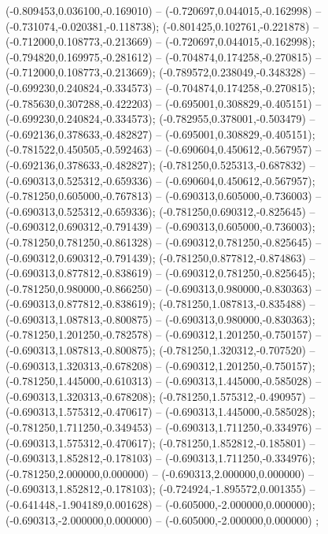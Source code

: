  (-0.809453,0.036100,-0.169010) -- (-0.720697,0.044015,-0.162998) -- (-0.731074,-0.020381,-0.118738);
 (-0.801425,0.102761,-0.221878) -- (-0.712000,0.108773,-0.213669) -- (-0.720697,0.044015,-0.162998);
 (-0.794820,0.169975,-0.281612) -- (-0.704874,0.174258,-0.270815) -- (-0.712000,0.108773,-0.213669);
 (-0.789572,0.238049,-0.348328) -- (-0.699230,0.240824,-0.334573) -- (-0.704874,0.174258,-0.270815);
 (-0.785630,0.307288,-0.422203) -- (-0.695001,0.308829,-0.405151) -- (-0.699230,0.240824,-0.334573);
 (-0.782955,0.378001,-0.503479) -- (-0.692136,0.378633,-0.482827) -- (-0.695001,0.308829,-0.405151);
 (-0.781522,0.450505,-0.592463) -- (-0.690604,0.450612,-0.567957) -- (-0.692136,0.378633,-0.482827);
 (-0.781250,0.525313,-0.687832) -- (-0.690313,0.525312,-0.659336) -- (-0.690604,0.450612,-0.567957);
 (-0.781250,0.605000,-0.767813) -- (-0.690313,0.605000,-0.736003) -- (-0.690313,0.525312,-0.659336);
 (-0.781250,0.690312,-0.825645) -- (-0.690312,0.690312,-0.791439) -- (-0.690313,0.605000,-0.736003);
 (-0.781250,0.781250,-0.861328) -- (-0.690312,0.781250,-0.825645) -- (-0.690312,0.690312,-0.791439);
 (-0.781250,0.877812,-0.874863) -- (-0.690313,0.877812,-0.838619) -- (-0.690312,0.781250,-0.825645);
 (-0.781250,0.980000,-0.866250) -- (-0.690313,0.980000,-0.830363) -- (-0.690313,0.877812,-0.838619);
 (-0.781250,1.087813,-0.835488) -- (-0.690313,1.087813,-0.800875) -- (-0.690313,0.980000,-0.830363);
 (-0.781250,1.201250,-0.782578) -- (-0.690312,1.201250,-0.750157) -- (-0.690313,1.087813,-0.800875);
 (-0.781250,1.320312,-0.707520) -- (-0.690313,1.320313,-0.678208) -- (-0.690312,1.201250,-0.750157);
 (-0.781250,1.445000,-0.610313) -- (-0.690313,1.445000,-0.585028) -- (-0.690313,1.320313,-0.678208);
 (-0.781250,1.575312,-0.490957) -- (-0.690313,1.575312,-0.470617) -- (-0.690313,1.445000,-0.585028);
 (-0.781250,1.711250,-0.349453) -- (-0.690313,1.711250,-0.334976) -- (-0.690313,1.575312,-0.470617);
 (-0.781250,1.852812,-0.185801) -- (-0.690313,1.852812,-0.178103) -- (-0.690313,1.711250,-0.334976);
 (-0.781250,2.000000,0.000000) -- (-0.690313,2.000000,0.000000) -- (-0.690313,1.852812,-0.178103);
 (-0.724924,-1.895572,0.001355) -- (-0.641448,-1.904189,0.001628) -- (-0.605000,-2.000000,0.000000);
 (-0.690313,-2.000000,0.000000) -- (-0.605000,-2.000000,0.000000) ;
